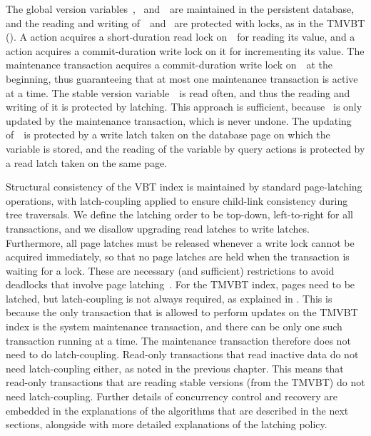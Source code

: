The global version variables~\comver, \stablever\ and~\movever\ are
maintained in the persistent database, and the reading and writing of~\comver\
and \movever\ are protected with locks, as in the TMVBT
().
A  action acquires a short-duration read lock
on~\comver\ for reading its value, and a \action{commit-update}
action acquires a commit-duration write lock on it for incrementing
its value. 
The maintenance transaction acquires a commit-duration write lock
on~\movever\ at the beginning, thus guaranteeing that at most
one maintenance transaction is active at a time.
The stable version variable~\stablever\ is read often, and thus the reading
and writing of it is protected by latching.
This approach is sufficient, because \stablever\ is only updated by the
maintenance transaction, which is never undone.
The updating of~\stablever\ is protected by a write latch taken on the
database page on which the variable is stored, and the reading of the
variable by query actions is protected by a read latch taken on the same
page.

Structural consistency of the VBT index is maintained by standard
page-latching operations, with latch-coupling applied to ensure child-link
consistency during tree traversals.
We define the latching order to be top-down, left-to-right for all
transactions, and we disallow upgrading read latches to write latches.
Furthermore, all page latches must be released whenever a write lock
cannot be acquired immediately, so that no page latches are held when the
transaction is waiting for a lock.
These are necessary (and sufficient) restrictions to avoid deadlocks
that involve page latching~\cite{gray:1993:transactionprocessing}.
For the TMVBT index, pages need to be latched, but latch-coupling is
not always required, as explained in \secref{sec:tmvbt:actions}. 
This is because the only transaction that is allowed to perform updates on
the TMVBT index is the system maintenance transaction, and there can be
only one such transaction running at a time.
The maintenance transaction therefore does not need to do latch-coupling.
Read-only transactions that read inactive data do not need latch-coupling
either, as noted in the previous chapter.
This means that read-only transactions that are reading stable versions
(from the TMVBT) do not need latch-coupling.
Further details of concurrency control and recovery are embedded in the
explanations of the algorithms that are described in the next sections,
alongside with more detailed explanations of the latching policy.



